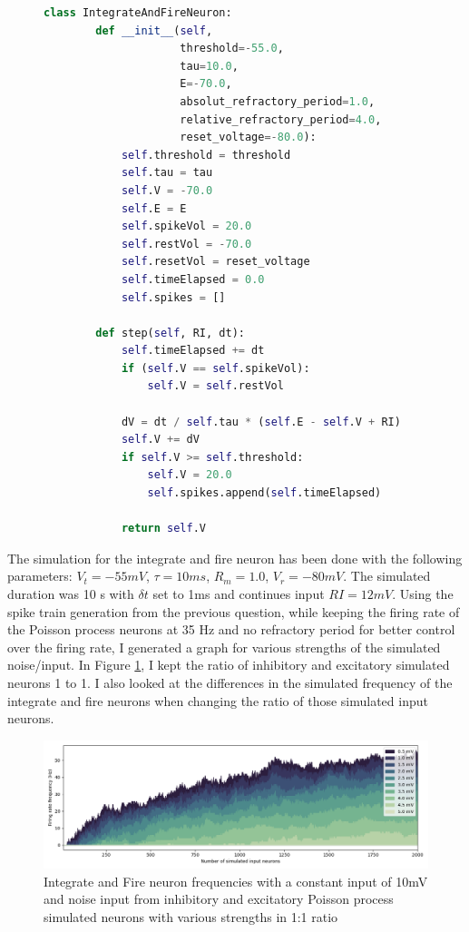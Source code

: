 \documentclass[11pt]{article}
\begin{document}
\begin{figure}
    \begin{lstlisting}[language=Python]
    class IntegrateAndFireNeuron:
        def __init__(self, 
                     threshold=-55.0, 
                     tau=10.0, 
                     E=-70.0, 
                     absolut_refractory_period=1.0, 
                     relative_refractory_period=4.0, 
                     reset_voltage=-80.0):
            self.threshold = threshold             
            self.tau = tau                         
            self.V = -70.0                         
            self.E = E                            
            self.spikeVol = 20.0                   
            self.restVol = -70.0                   
            self.resetVol = reset_voltage          
            self.timeElapsed = 0.0                 
            self.spikes = []
    
        def step(self, RI, dt):
            self.timeElapsed += dt
            if (self.V == self.spikeVol):
                self.V = self.restVol
    
            dV = dt / self.tau * (self.E - self.V + RI)
            self.V += dV
            if self.V >= self.threshold:
                self.V = 20.0  
                self.spikes.append(self.timeElapsed)
    
            return self.V
    \end{lstlisting}
\end{figure}

The simulation for the integrate and fire neuron has been done with the following parameters: $V_{t} = -55mV$, $\tau = 10ms$, $R_{m} = 1.0$, $V_{r} = -80mV$. The simulated duration was 10 s with $\delta t$ set to 1ms and continues input $RI = 12mV$. Using the spike train generation from the previous question, while keeping the firing rate of the Poisson process neurons at 35 Hz and no refractory period for better control over the firing rate, I generated a graph for various strengths of the simulated noise/input. In Figure \ref{fig:q3_graph1}, I kept the ratio of inhibitory and excitatory simulated neurons 1 to 1. I also looked at the differences in the simulated frequency of the integrate and fire neurons when changing the ratio of those simulated input neurons.

\begin{figure}[ht]
    \includegraphics[width=1\linewidth]{Figure_1.png}
    \caption{Integrate and Fire neuron frequencies with a constant input of 10mV and noise input from inhibitory and excitatory Poisson process simulated neurons with various strengths in 1:1 ratio}
    \label{fig:q3_graph1}
\end{figure}
\end{document}
